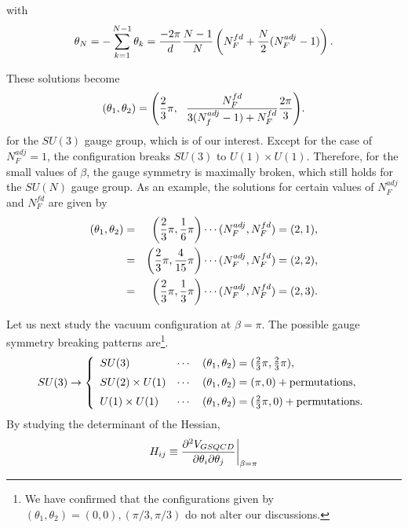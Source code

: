\documentclass[a4paper,12pt]{article}
\begin{document}
with
\begin{equation}
\theta_N=-\sum_{k=1}^{N-1}\theta_k={{-2\pi}\over d}{{N-1}\over N}
\left(N_F^{fd}+{N\over 2}(N_F^{adj}-1)\right).
\end{equation}
\par
These solutions become 
\begin{equation}
(\theta_1,\theta_2)=\Biggl({2\over 3}\pi,~~
{{N_F^{fd}}\over{3(N_f^{adj}-1)+N_F^{fd}}}{{2\pi}\over 3}\Biggr).
\label{solsu3}
\end{equation}
for the $SU(3)$ gauge group, which is of our interest.
Except for the case of $N_F^{adj}=1$, the configuration
breaks $SU(3)$ to $U(1)\times U(1)$. Therefore, for the small values of 
$\beta$, the gauge symmetry is maximally broken, which still holds for 
the $SU(N)$ gauge group.
As an example, the solutions for certain values of $N_F^{adj}$
and $N_F^{fd}$ are given by
\begin{eqnarray}
(\theta_1, \theta_2)&=&
\left({2\over 3}\pi, {1\over 6}\pi\right)\cdots (N_F^{adj},N_F^{fd})=(2, 1),
\nonumber\\
&=&\left({2\over 3}\pi, {4\over {15}}\pi\right)
\cdots (N_F^{adj},N_F^{fd})=(2, 2),\nonumber\\
&=&\left({2\over 3}\pi, {1\over 3}\pi\right)
\cdots (N_F^{adj},N_F^{fd})=(2, 3).
\label{example}
\end{eqnarray}
\par
Let us next study the vacuum configuration at $\beta=\pi$. 
The possible gauge symmetry breaking 
patterns are\footnote{We have confirmed that the configurations given 
by $(\theta_1, \theta_2)=(0, 0), (\pi/3, \pi/3) $ do not alter 
our discussions.}.
\begin{equation}
SU(3)\rightarrow \left\{\begin{array}{lcl}
SU(3) & \cdots& (\theta_1, \theta_2)=
({2\over 3}\pi, {2\over 3}\pi),\\[0.2cm]
SU(2) \times U(1)& \cdots & (\theta_1, \theta_2)=(\pi, 0) 
+{\rm permutations},\\[0.2cm]
U(1)\times U(1) & \cdots &(\theta_1, \theta_2)
=({2\over 3}\pi, 0)+{\rm permutations}. 
\end{array}\right.
\label{exampleb}
\end{equation}
By studying the determinant of the Hessian,
\begin{equation}
H_{ij}\equiv {{\partial^2V_{GSQCD}}\over{\partial\theta_i\partial\theta_j}}
\bigg|_{\beta=\pi}
\label{hessiana}
\end{equation}
\end{document}
